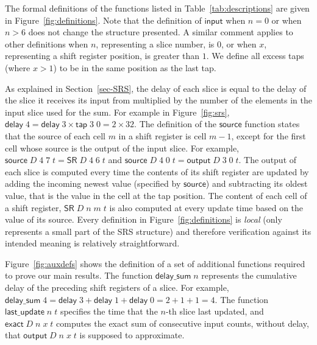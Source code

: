 \documentclass{llncs}
\begin{document}
The formal definitions of the functions listed in Table~\ref{tab:descriptions} are given in Figure~\ref{fig:definitions}.
Note that the definition of $\mathsf{input}$ when $n=0$ or when $n>6$ does not change the structure presented.
A similar comment applies to other definitions when $n$, representing a slice number, is $0$, or when $x$, representing a shift register position, is greater than $1$.
We define all excess taps (where $x > 1$) to be in the same position as the last tap.

As explained in Section~\ref{sec-SRS}, the delay of each slice is equal to the delay of the slice it receives its input from multiplied by the number of the elements in the input slice used for the sum.
For example in Figure~\ref{fig:srs}, $\mathsf{delay}\;4 = \mathsf{delay}\;3 \times \mathsf{tap}\;3\;0 = 2 \times 32$.
The definition of the $\mathsf{source}$ function states that the source of each cell $m$ in a shift register is cell $m-1$, except for the first cell whose source is the output of the input slice.
For example, $\mathsf{source}\;D\;4\;7\;t = \mathsf{SR}\;D\;4\;6\;t$ and $\mathsf{source}\;D\;4\;0\;t = \mathsf{output}\;D\;3\;0\;t$.
The output of each slice is computed every time the contents of its shift register are updated by adding the incoming newest value (specified by $\mathsf{source}$) and subtracting its oldest value, that is the value in the cell at the tap position.
The content of each cell of a shift register, $\mathsf{SR}\;D\;n\;m\;t$  is also computed at every update time based on the value of its source.
Every definition in Figure~\ref{fig:definitions} is \emph{local} (only represents a small part of the SRS structure) and therefore verification against its intended meaning is relatively straightforward.

Figure~\ref{fig:auxdefs} shows the definition of a set of additional functions required to prove our main results.
The function $\mathsf{delay\_sum}\;n$ represents the cumulative delay of the preceding shift registers of a slice.
For example, $\mathsf{delay\_sum}\;4 = \mathsf{delay}\;3 + \mathsf{delay}\;1 + \mathsf{delay}\;0 = 2 +1 +1 = 4$.
The function $\mathsf{last\_update}\;n\;t$ specifies the time that the $n$-th slice last updated, and $\mathsf{exact}\;D\;n\;x\;t$ computes the exact sum of consecutive input counts, without delay, that $\mathsf{output}\;D\;n\;x\;t$ is supposed to approximate.
\end{document}
